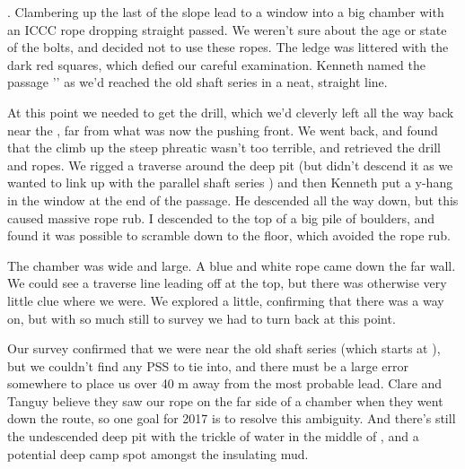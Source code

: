 . Clambering up the last of the slope lead to a window into a big chamber with an ICCC rope dropping straight passed. We weren’t sure about the age or state of the bolts, and decided not to use these ropes. The ledge was littered with the dark red squares, which defied our careful examination. Kenneth named the passage '' as we’d reached the old shaft series in a neat, straight line.
 
At this point we needed to get the drill, which we’d cleverly left all the way back near the , far from what was now the pushing front. We went back, and found that the climb up the steep phreatic wasn’t too terrible, and retrieved the drill and ropes. We rigged a traverse around the deep pit (but didn’t descend it as we wanted to link up with the parallel shaft series ) and then Kenneth put a y-hang in the window at the end of the passage. He descended all the way down, but this caused massive rope rub. I descended to the top of a big pile of boulders, and found it was possible to scramble down to the floor, which avoided the rope rub.
 
The chamber was wide and large. A blue and white rope came down the far wall. We could see a traverse line leading off at the top, but there was otherwise very little clue where we were. We explored a little, confirming that there was a way on, but with so much still to survey we had to turn back at this point.
 
Our survey confirmed that we were near the old shaft series (which starts at ), but we couldn’t find any PSS to tie into, and there must be a large error somewhere to place us over 40 m away from the most probable lead. Clare and Tanguy believe they saw our rope on the far side of a chamber when they went down the  route, so one goal for 2017 is to resolve this ambiguity. And there’s still the undescended deep pit with the trickle of water in the middle of , and a potential deep camp spot amongst the insulating mud.
 
